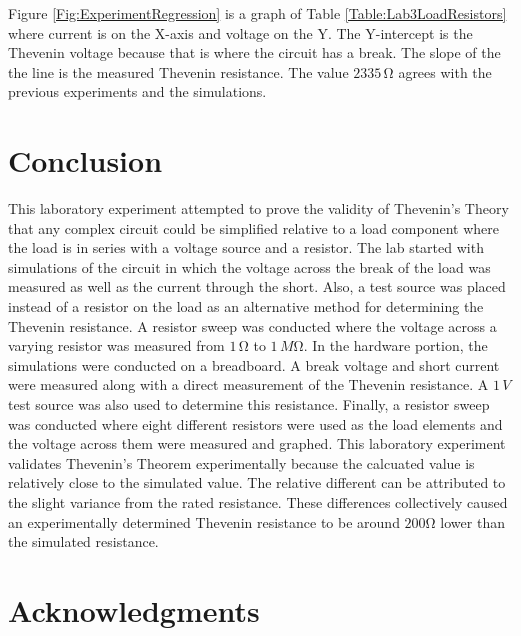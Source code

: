 \documentclass[11pt]{article}
\begin{document}
Figure \ref{Fig:ExperimentRegression} is a graph of Table \ref{Table:Lab3LoadResistors} where current is on the X-axis and voltage on the Y. The Y-intercept is the Thevenin voltage because that is where the circuit has a break. The slope of the the line is the measured Thevenin resistance. The value $2335\,\si\ohm$ agrees with the previous experiments and the simulations.

\section{Conclusion}

This laboratory experiment attempted to prove the validity of Thevenin's Theory that any complex circuit could be simplified relative to a load component where the load is in series with a voltage source and a resistor. The lab started with simulations of the circuit in which the voltage across the break of the load was measured as well as the current through the short. Also, a test source was placed instead of a resistor on the load as an alternative method for determining the Thevenin resistance. A resistor sweep was conducted where the voltage across a varying resistor was measured from $1\,\si\ohm$ to $1\,M\si\ohm$. In the hardware portion, the simulations were conducted on a breadboard. A break voltage and short current were measured along with a direct measurement of the Thevenin resistance. A $1\,V$ test source was also used to determine this resistance. Finally, a resistor sweep was conducted where eight different resistors were used as the load elements and the voltage across them were measured and graphed. This laboratory experiment validates Thevenin's Theorem experimentally because the calcuated value is relatively close to the simulated value. The relative different can be attributed to the slight variance from the rated resistance. These differences collectively caused an experimentally determined Thevenin resistance to be around $200\si\ohm$ lower than the simulated resistance.


\pagebreak
\section{Acknowledgments}
\end{document}

